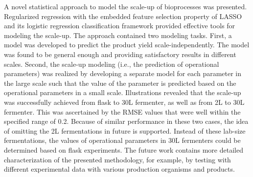 \documentclass{article}
\begin{document}
A novel statistical approach to model the scale-up of bioprocesses was presented. Regularized regression with the embedded feature selection property of LASSO and its logistic regression classification framework provided effective tools for modeling the scale-up. The approach contained two modeling tasks. First, a model was developed to predict the product yield scale-independently. The model was found to be general enough and providing satisfactory results in different scales. Second, the scale-up modeling (i.e., the prediction of operational parameters) was realized by developing a separate model for each parameter in the large scale such that the value of the parameter is predicted based on the operational parameters in a small scale. Illustrations revealed that the scale-up was successfully achieved from flask to 30L fermenter, as well as from 2L to 30L fermenter. This was ascertained by the RMSE values that were well within the specified range of 0.2. Because of similar performance in these two cases, the idea of omitting the 2L fermentations in future is supported. Instead of these lab-size fermentations, the values of operational parameters in 30L fermenters could be determined based on flask experiments. The future work contains more detailed characterization of the presented methodology, for example, by testing with different experimental data with various production organisms and products.

%




\end{document}
